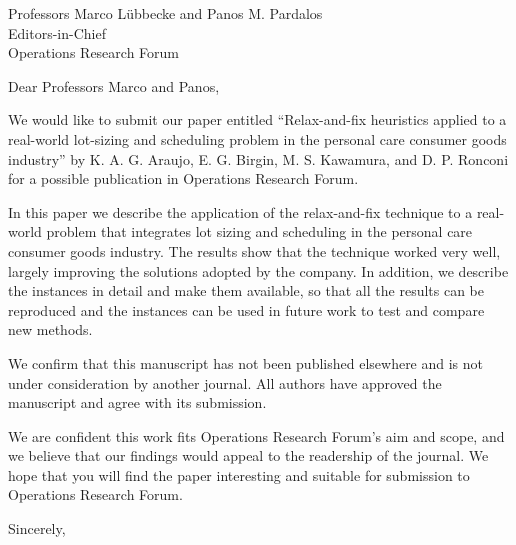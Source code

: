 \documentclass[11pt]{letter}
\date{July 22th, 2020}
\begin{document}
\begin{letter}{Professors Marco L\"ubbecke and Panos M. Pardalos\\
               Editors-in-Chief  \\
               Operations Research Forum}

\opening{Dear Professors Marco and Panos,}

\vspace{0.5cm}

We would like to submit our paper entitled ``Relax-and-fix heuristics
applied to a real-world lot-sizing and scheduling problem in the
personal care consumer goods industry'' by K. A. G. Araujo,
E. G. Birgin, M. S. Kawamura, and D. P. Ronconi for a possible
publication in Operations Research Forum.

In this paper we describe the application of the relax-and-fix
technique to a real-world problem that integrates lot sizing and
scheduling in the personal care consumer goods industry. The results
show that the technique worked very well, largely improving the
solutions adopted by the company. In addition, we describe the
instances in detail and make them available, so that all the results
can be reproduced and the instances can be used in future work to test
and compare new methods.

We confirm that this manuscript has not been published elsewhere and
is not under consideration by another journal. All authors have
approved the manuscript and agree with its submission.

We are confident this work fits Operations Research Forum's aim and
scope, and we believe that our findings would appeal to the readership
of the journal. We hope that you will find the paper interesting and
suitable for submission to Operations Research Forum.


\closing{Sincerely,}
\end{letter}
\end{document}
